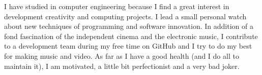 I have studied in computer engineering because I find a great interest in development creativity and computing projects. I lead a small personal watch about new techniques of programming and software innovation. In addition of a fond fascination of the independent cinema and the electronic music, I contribute to a development team during my free time on GitHub and I try to do my best for making music and video. As far as I have a good health (and I do all to maintain it), I am motivated, a little bit perfectionist and a very bad joker.
\vspace{.25em}
